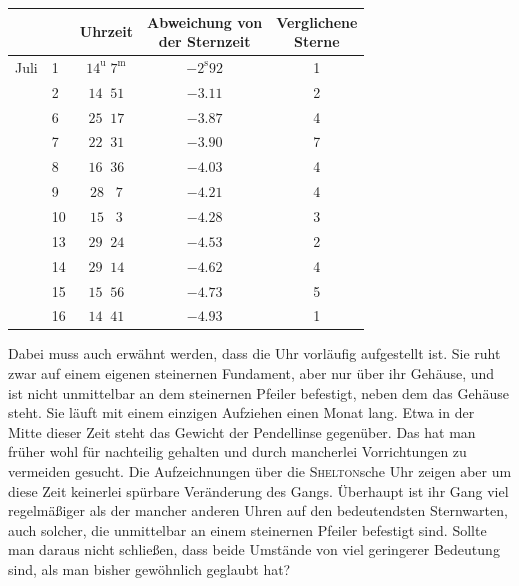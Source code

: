 \begin{center}
\begin{tabular}{ll|c|c|c}
 & & Uhrzeit & \shortstack{Abweichung von\\der Sternzeit} & \shortstack{Verglichene\\Sterne} \\
\hline
Juli & 1 & $14^{\mathrm u}\;7^{\mathrm m}$ & $-2^{\mathrm s}92$ & 1 \\
 & 2 & $14\;\;51$ & $-3.11$ & 2 \\
 & 6 & $25\;\;17$ & $-3.87$ & 4 \\
 & 7 & $22\;\;31$ & $-3.90$ & 7 \\
 & 8 & $16\;\;36$ & $-4.03$ & 4 \\
 & 9 & $28\;\;\;7$ & $-4.21$ & 4 \\
 & 10 & $15\;\;\;3$ & $-4.28$ & 3 \\
 & 13 & $29\;\;24$ & $-4.53$ & 2 \\
 & 14 & $29\;\;14$ & $-4.62$ & 4 \\
 & 15 & $15\;\;56$ & $-4.73$ & 5 \\
 & 16 & $14\;\;41$ & $-4.93$ & 1 \\
\end{tabular}
\end{center}

\par\indent Dabei muss auch erwähnt werden, dass die Uhr vorläufig aufgestellt ist. Sie ruht zwar auf einem eigenen steinernen Fundament, aber nur über ihr Gehäuse, und ist nicht unmittelbar an dem steinernen Pfeiler befestigt, neben dem das Gehäuse steht. Sie läuft mit einem einzigen Aufziehen einen Monat lang. Etwa in der Mitte dieser Zeit steht das Gewicht der Pendellinse gegenüber. Das hat man früher wohl für nachteilig gehalten und durch mancherlei Vorrichtungen zu vermeiden gesucht. Die Aufzeichnungen über die \textsc{Shelton}sche Uhr zeigen aber um diese Zeit keinerlei spürbare Veränderung des Gangs. Überhaupt ist ihr Gang viel regelmäßiger als der mancher anderen Uhren auf den bedeutendsten Sternwarten, auch solcher, die unmittelbar an einem steinernen Pfeiler befestigt sind. Sollte man daraus nicht schließen, dass beide Umstände von viel geringerer Bedeutung sind, als man bisher gewöhnlich geglaubt hat?
